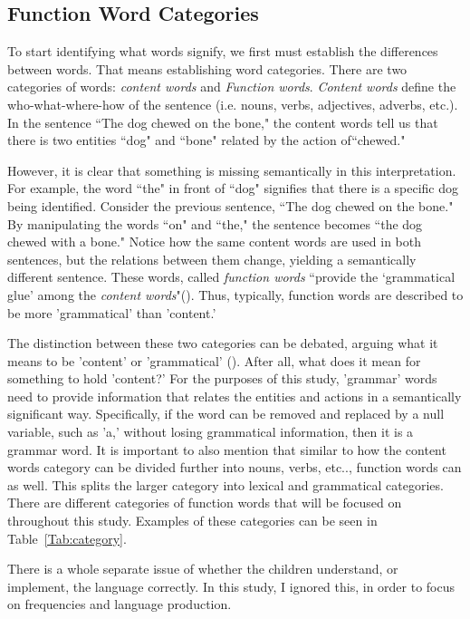 \documentclass{article}
\theoremstyle{plain}
\theoremstyle{definition}
\theoremstyle{remark}
\numberwithin{equation}{section}
\begin{document}
\subsection{Function Word Categories}
To start identifying what words signify, we first must establish the differences between words. That means establishing word categories. There are two categories of words: \emph{content words} and \emph{Function words}. \emph{Content words} define the who-what-where-how of the sentence (i.e. nouns, verbs, adjectives, adverbs, etc.). In the sentence ``The dog chewed on the bone," the content words tell us that there is two entities ``dog" and ``bone" related by the action of``chewed."

However, it is clear that something is missing semantically in this interpretation. For example, the word ``the" in front of ``dog" signifies that there is a specific dog being identified. Consider the previous sentence, ``The dog chewed on the bone." By manipulating the words ``on" and ``the," the sentence becomes ``the dog chewed with a bone."  Notice how the same content words are used in both sentences, but the relations between them change, yielding a semantically different sentence. These words, called \emph{function words} ``provide the ‘grammatical glue’ among the \emph{content words}"(\cite{pittphilsci16750}). Thus, typically, function words are described to be more 'grammatical' than 'content.'

The distinction between these two categories can be debated, arguing what it means to be 'content' or 'grammatical' (\cite{pittphilsci16750}). After all, what does it mean for something to hold 'content?' For the purposes of this study, 'grammar' words need to provide information that relates the entities and actions in a semantically significant way. Specifically, if the word can be removed and replaced by a null variable, such as 'a,' without losing grammatical information, then it is a grammar word. It is important to also mention that similar to how the content words category can be divided further into nouns, verbs, etc.., function words can as well. This splits the larger category into lexical and grammatical categories. There are different categories of function words that will be focused on throughout this study. Examples of these categories can be seen in Table~\ref{Tab:category}.

There is a whole separate issue of whether the children understand, or implement, the language correctly. In this study, I ignored this, in order to focus on frequencies and language production. 
\end{document}
